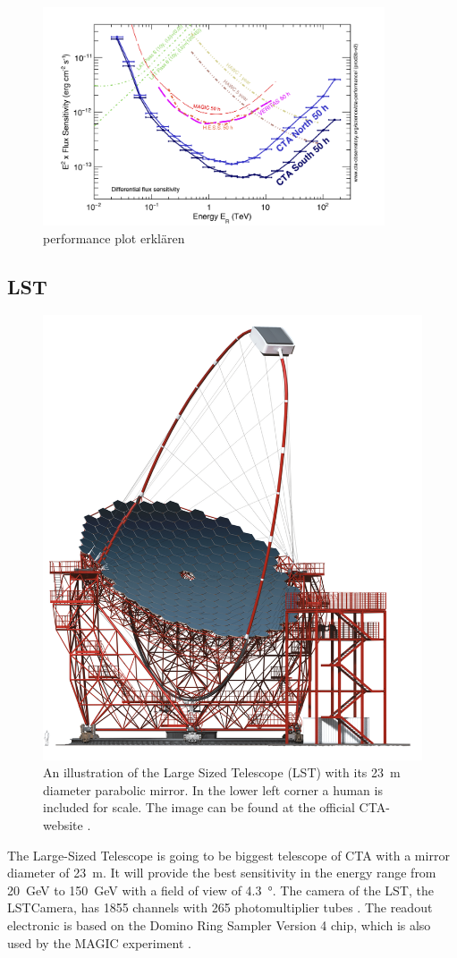 \begin{figure}[H]
	\center
	\captionsetup{width=0.9\linewidth}
	\includegraphics[width=0.9\textwidth]{images/cta_performance.png}
	\caption{performance plot erklären}
	\label{fig:cta_performance}
\end{figure}

\newpage
\subsection{LST}
\label{sec:lst}

\begin{figure}
		\centering
		\captionsetup{width=0.9\linewidth}
		\includegraphics[width=.4\textwidth]{images/LST.png}
		\caption{
			An illustration of the Large Sized Telescope (LST) with its
			\SI{23}{\meter} diameter parabolic mirror.
			In the lower left corner a human is included for scale.
			The image can be found at the official CTA-website \cite{cta_web}.}
		\label{fig:lst}
\end{figure}

The Large-Sized Telescope is going to be biggest telescope of CTA
with a mirror diameter of \SI{23}{\meter}.
It will provide the best sensitivity in the energy range from 
\SI{20}{\giga\electronvolt} to \SI{150}{\giga\electronvolt} with a field of view of \SI{4.3}{\degree}.
The camera of the LST, the LSTCamera, has \num{1855} channels 
with \num{265} photomultiplier tubes \cite{cta_web}.
The readout electronic is based on the Domino Ring Sampler 
Version 4 chip, which is also used by the MAGIC experiment
\cite{Kubo:2013pwa}. 

